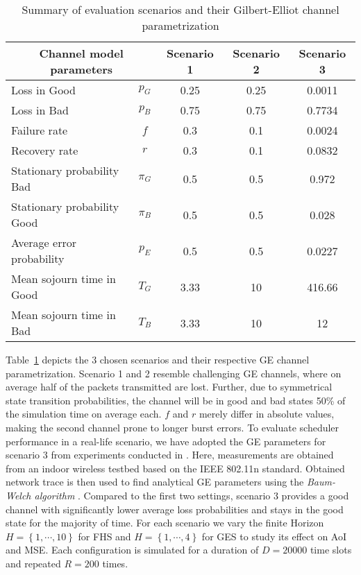 \begin{table}[htb]
  \begin{center}
  \begin{tabular}{|lc|c|c|c|} 
  \hline
  \multicolumn{2}{|c|}{\textbf{Channel model parameters}} & \textbf{Scenario 1} & \textbf{Scenario 2} & \textbf{Scenario 3} \\
  \hline \hline
  Loss in Good & $p_G$ & 0.25 & 0.25 & 0.0011 \\ 
  Loss in Bad & $p_B$ & 0.75 & 0.75 &  0.7734 \\ 
  Failure rate & $f$ & 0.3 & 0.1 & 0.0024 \\ 
  Recovery rate & $r$ & 0.3 & 0.1 & 0.0832 \\
  \hline
  Stationary probability Bad & $\pi_G$ & 0.5 & 0.5 & 0.972 \\
  Stationary probability Good & $\pi_B$ & 0.5 & 0.5 & 0.028 \\
  Average error probability & $p_E$ & 0.5 & 0.5 & 0.0227 \\
  Mean sojourn time in Good & $T_G$ & 3.33 & 10 & 416.66 \\
  Mean sojourn time in Bad & $T_B$ & 3.33 & 10 & 12 \\
  \hline
  \end{tabular}
  \end{center}
  \caption{Summary of evaluation scenarios and their Gilbert-Elliot channel parametrization}
  \label{tab:scenarios}
\end{table}

Table~\ref{tab:scenarios} depicts the 3 chosen scenarios and their respective GE
channel parametrization. Scenario 1 and 2 resemble challenging GE channels,
where on average half of the packets transmitted are lost. Further, due to
symmetrical state transition probabilities, the channel will be in good and bad
states 50\% of the simulation time on average each. $f$ and $r$ merely differ in
absolute values, making the second channel prone to longer burst errors. To
evaluate scheduler performance in a real-life scenario, we have adopted the GE
parameters for scenario 3 from experiments conducted in
\cite{frohn2011analyzing}. Here, measurements are obtained from an indoor
wireless testbed based on the IEEE 802.11n standard. Obtained network trace is
then used to find analytical GE parameters using the \textit{Baum-Welch
algorithm} \cite{baum1970maximization}. Compared to the first two settings,
scenario 3 provides a good channel with significantly lower average loss
probabilities and stays in the good state for the majority of time. For each
scenario we vary the finite Horizon $H=\left\{ 1, \cdots, 10\right\}$ for FHS
and $H=\left\{ 1, \cdots, 4\right\}$ for GES to study its effect on AoI and MSE.
Each configuration is simulated for a duration of $D=20000$ time slots and
repeated $R=200$ times. 

